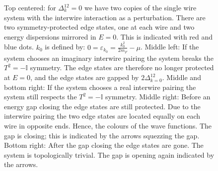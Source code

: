 \begin{figure}
\begin{tikzpicture}
\end{tikzpicture}
\caption{Top centered: for $\Delta^{12}_k=0$ we have two copies of the single wire system with the interwire interaction as a perturbation. There are two symmetry-protected edge states, one at each wire and two energy dispersions mirrored in $E = 0$. This is indicated with red and blue dots. $k_0$ is defined by: $0 = \varepsilon_{k_0} = \frac{k^2_0}{2m_F} - \mu$. Middle left: If the system chooses an imaginary interwire pairing the system breaks the $T^2 = -\mathbb{I}$ symmetry. The edge states are therefore no longer protected at $E = 0$, and the edge states are gapped by $2\Delta^{12}_{k=0}$. Middle and bottom right: If the system chooses a real interwire pairing the system still respects the $T^2 = -\mathbb{I}$ symmetry. Middle right: Before an energy gap closing the edge states are still protected. Due to the interwire pairing the two edge states are located equally on each wire in opposite ends. Hence, the colours of the wave functions. The gap is closing; this is indicated by the arrows squezzing the gap. Bottom right: After the gap closing the edge states are gone. The system is topologically trivial. The gap is opening again indicated by the arrows.}
\label{fig.2wiresedgestates}
\end{figure}

